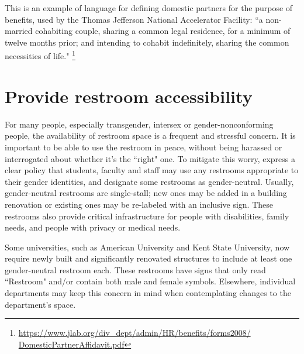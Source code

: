 This is an example of language for defining domestic partners for the purpose of benefits, used by the Thomas Jefferson National Accelerator Facility: ``a non-married cohabiting couple, sharing a common legal residence, for a minimum of twelve months prior; and intending to cohabit indefinitely, sharing the common necessities of life."
\footnote{\href{https://www.jlab.org/div_dept/admin/HR/benefits/forms2008/DomesticPartnerAffidavit.pdf}{https://www.jlab.org/div\_dept/admin/HR/benefits/forms2008/\\DomesticPartnerAffidavit.pdf}}


\section {Provide restroom accessibility}
\label{restrooms}
For many people, especially transgender, intersex or gender-nonconforming people, the availability of restroom space is a frequent and stressful concern. It is important to be able to use the restroom in peace, without being harassed or interrogated about whether it's the ``right" one. To mitigate this worry, express a clear policy that students, faculty and staff may use any restrooms appropriate to their gender identities, and designate some restrooms as gender-neutral. Usually, gender-neutral restrooms are single-stall; new ones may be added in a building renovation or existing ones may be re-labeled with an inclusive sign. These restrooms also provide critical infrastructure for people with disabilities, family needs, and people with privacy or medical needs.

Some universities, such as American University and Kent State University, now require newly built and significantly renovated structures to include at least one gender-neutral restroom each. These restrooms have signs that only read ``Restroom" and/or contain both male and female symbols. Elsewhere, individual departments may keep this concern in mind when contemplating changes to the department's space.

\newpage
